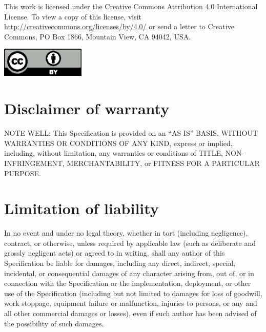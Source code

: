 \documentclass{uavcandoc}
\begin{document}
\begin{titlepage}
This work is licensed under the Creative Commons Attribution 4.0 International License.
To view a copy of this license, visit \url{http://creativecommons.org/licenses/by/4.0/}
or send a letter to Creative Commons, PO Box 1866, Mountain View, CA 94042, USA.

\begin{center}
    \includegraphics[width=0.3\textwidth]{cc-by}
\end{center}

\BeginRightColumn

\section*{Disclaimer of warranty}

NOTE WELL: This Specification is provided on an ``AS IS'' BASIS, WITHOUT WARRANTIES OR CONDITIONS OF ANY KIND,
express or implied, including, without limitation, any warranties or conditions of
TITLE, NON-INFRINGEMENT, MERCHANTABILITY, or FITNESS FOR A PARTICULAR PURPOSE.

\BeginRightColumn

\section*{Limitation of liability}

In no event and under no legal theory, whether in tort (including negligence), contract, or otherwise,
unless required by applicable law (such as deliberate and grossly negligent acts) or agreed to in writing,
shall any author of this Specification be liable for damages,
including any direct, indirect, special, incidental, or consequential damages of any character arising
from, out of, or in connection with the Specification or the implementation, deployment,
or other use of the Specification (including but not limited to damages for loss of goodwill,
work stoppage, equipment failure or malfunction, injuries to persons,
or any and all other commercial damages or losses),
even if such author has been advised of the possibility of such damages.

\end{titlepage}

\tableofcontents
\clearpage\onecolumn\listoftables
\clearpage\onecolumn\listoffigures

\mainmatter








\end{document}

